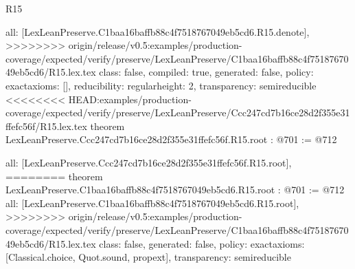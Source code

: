 \begin{lexlean}{R15}
\begin{coremodule}
{{{{{  all: [LexLeanPreserve.C1baa16baffb88c4f7518767049eb5cd6.R15.denote],
>>>>>>>> origin/release/v0.5:examples/production-coverage/expected/verify/preserve/LexLeanPreserve/C1baa16baffb88c4f7518767049eb5cd6/R15.lex.tex
  class: false,
  compiled: true,
  generated: false,
  policy: exact{axioms: []},
  reducibility: regular{height: 2},
  transparency: semireducible
}
<<<<<<<< HEAD:examples/production-coverage/expected/verify/preserve/LexLeanPreserve/Ccc247cd7b16ce28d2f355e31ffefc56f/R15.lex.tex
theorem LexLeanPreserve.Ccc247cd7b16ce28d2f355e31ffefc56f.R15.root : @701 := @712 {
  all: [LexLeanPreserve.Ccc247cd7b16ce28d2f355e31ffefc56f.R15.root],
========
theorem LexLeanPreserve.C1baa16baffb88c4f7518767049eb5cd6.R15.root : @701 := @712 {
  all: [LexLeanPreserve.C1baa16baffb88c4f7518767049eb5cd6.R15.root],
>>>>>>>> origin/release/v0.5:examples/production-coverage/expected/verify/preserve/LexLeanPreserve/C1baa16baffb88c4f7518767049eb5cd6/R15.lex.tex
  class: false,
  generated: false,
  policy: exact{axioms: [Classical.choice, Quot.sound, propext]},
  transparency: semireducible
}

}}}}}
\end{coremodule}
\end{lexlean}
